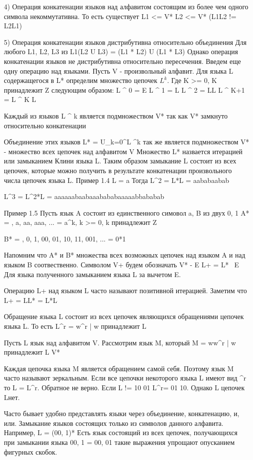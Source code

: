 {4) Операция конкатенации языков над алфавитом состоящим из более чем одного символа некоммутативна. То есть существует L1 <= V* L2 <= V* (L1L2 != L2L1)

5) Операция конкатенации языков дистрибутивна относительно объединения
Для любого L1, L2, L3 из L1(L2 U L3) = (L1 * L2) U (L1 * L3)
Однако операция конкатенации языков не дистрибутивна относительно пересечения.
Введем еще одну операцию над языками.
Пусть V - произвольный алфавит. Для языка L содержащегося в L* определим множество цепочек $L^k$. Где K >= 0, K принадлежит Z следующим образом:
L ^ 0 = E
L ^ 1 = L 
L ^ 2 = LL
L ^ K+1 = L ^ K L

Каждый из языков L ^ k является подмножеством
V* так как V* замкнуто относительно конкатенации

Объединение этих языков L* =  U_k=0^\inf L ^k так же является подмножеством V* - множество всех цепочек над алфавитом V
Множество L* назвается итерацией или замыканием Клини языка L. Таким образом замыкание L состоит из всех цепочек, которые можно получить в результате конкатенации произвольного числа цепочек языка L.
Пример 1.4 L = a
Тогда L^2 = L*L = aababaabab

L^3 = L^2*L = aaaaaabaabaaabababaaaaabbababab

Пример 1.5
Пусть язык A состоит из единственного симовол a, B из двух {0, 1}
A* = {\eps, a, aa, aaa, ...} = {a^k, k >= 0, k принадлежит Z}

B* = {\eps, 0, 1, 00, 01, 10, 11, 001, ...} = {{0}*{1}}

Напомним что A* и B* множества всех возможных цепочек над языком A и над языком B соотвественно.
Символом V+ будем обозначать V* - E
L+ = L* \ E
Для языка полученного замыканием языка
L за вычетом E.

Операцию L+ над языком L часто называют позитивной итерацией. Заметим что L+ = LL* = L*L

Обращение языка L состоит из всех цепочек являющихся обращениями цепочек языка L. То есть L^r = {w^r | w принадлежит L}

Пусть L язык над алфавитом V. Рассмотрим язык M, который M = { ww^r | w принадлежит L \subset V*}

Каждая цепочка языка M является обращением самой себя. Поэтому язык M часто называют зеркальным. Если все цепочки некоторого языка L имеют вид \omega * \omega^r
то L = L^r. Обратное не верно. Если L != 10 01
L^r= 01 10. Однако L цепочек L\omega нет.

Часто бывает удобно представлять языки через объединение, конкатенацию, и, или. Замыкание языков состоящих только из символов данного алфавита. Например,
L = ({0}{0, 1})* 
Есть язык состоящий из всех цепочек, получающихся при замыкании языка {0}{0, 1} = {00, 01} такие выражения упрощают опусканием фигурных скобок.

}
